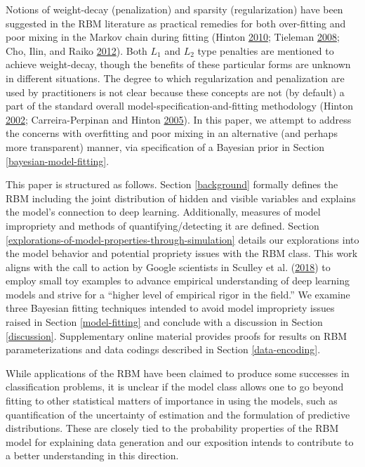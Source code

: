 \documentclass[]{article}
\theoremstyle{definition}
\begin{document}
Notions of weight-decay (penalization) and sparsity (regularization)
have been suggested in the RBM literature as practical remedies for both
over-fitting and poor mixing in the Markov chain during fitting (Hinton
\protect\hyperlink{ref-hinton2010practical}{2010}; Tieleman
\protect\hyperlink{ref-tieleman2008training}{2008}; Cho, Ilin, and Raiko
\protect\hyperlink{ref-cho2012tikhonov}{2012}). Both \(L_1\) and \(L_2\)
type penalties are mentioned to achieve weight-decay, though the
benefits of these particular forms are unknown in different situations.
The degree to which regularization and penalization are used by
practitioners is not clear because these concepts are not (by default) a
part of the standard overall model-specification-and-fitting methodology
(Hinton \protect\hyperlink{ref-hinton2002training}{2002};
Carreira-Perpinan and Hinton
\protect\hyperlink{ref-carreira2005contrastive}{2005}). In this paper,
we attempt to address the concerns with overfitting and poor mixing in
an alternative (and perhaps more transparent) manner, via specification
of a Bayesian prior in Section \ref{bayesian-model-fitting}.

This paper is structured as follows. Section \ref{background} formally
defines the RBM including the joint distribution of hidden and visible
variables and explains the model's connection to deep learning.
Additionally, measures of model impropriety and methods of
quantifying/detecting it are defined. Section
\ref{explorations-of-model-properties-through-simulation} details our
explorations into the model behavior and potential propriety issues with
the RBM class. This work aligns with the call to action by Google
scientists in Sculley et al.
(\protect\hyperlink{ref-sculley2018winner}{2018}) to employ small toy
examples to advance empirical understanding of deep learning models and
strive for a ``higher level of empirical rigor in the field.'' We
examine three Bayesian fitting techniques intended to avoid model
impropriety issues raised in Section \ref{model-fitting} and conclude
with a discussion in Section \ref{discussion}. Supplementary online
material provides proofs for results on RBM parameterizations and data
codings described in Section \ref{data-encoding}.

While applications of the RBM have been claimed to produce some
successes in classification problems, it is unclear if the model class
allows one to go beyond fitting to other statistical matters of
importance in using the models, such as quantification of the
uncertainty of estimation and the formulation of predictive
distributions. These are closely tied to the probability properties of
the RBM model for explaining data generation and our exposition intends
to contribute to a better understanding in this direction.
\end{document}
